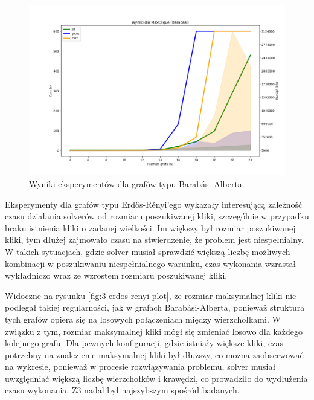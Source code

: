 \begin{figure}[htbp]
	\centering
	\begin{minipage}{\textwidth}
		\includegraphics[width=\textwidth]{./figures/3-barabasi-plot.png}
		\caption{Wyniki eksperymentów dla grafów typu Barabási-Alberta.}
		\label{fig:3-barabasi-plot}
	\end{minipage}
\end{figure}

Eksperymenty dla grafów typu Erdős-Rényi'ego wykazały interesującą zależność czasu działania solverów od rozmiaru poszukiwanej kliki, szczególnie w przypadku braku istnienia kliki o zadanej wielkości. Im większy był rozmiar poszukiwanej kliki, tym dłużej zajmowało czasu na stwierdzenie, że problem jest niespełnialny. W takich sytuacjach, gdzie solver musiał sprawdzić większą liczbę możliwych kombinacji w poszukiwaniu niespełnialnego warunku, czas wykonania wzrastał wykładniczo wraz ze wzrostem rozmiaru poszukiwanej kliki.

Widoczne na rysunku \ref{fig:3-erdos-renyi-plot}, że rozmiar maksymalnej kliki nie podlegał takiej regularności, jak w grafach Barabási-Alberta, ponieważ struktura tych grafów opiera się na losowych połączeniach między wierzchołkami. W związku z tym, rozmiar maksymalnej kliki mógł się zmieniać losowo dla każdego kolejnego grafu. Dla pewnych konfiguracji, gdzie istniały większe kliki, czas potrzebny na znalezienie maksymalnej kliki był dłuższy, co można zaobserwować na wykresie, ponieważ w procesie rozwiązywania problemu, solver musiał uwzględniać większą liczbę wierzchołków i krawędzi, co prowadziło do wydłużenia czasu wykonania. Z3 nadal był najszybszym spośród badanych.

